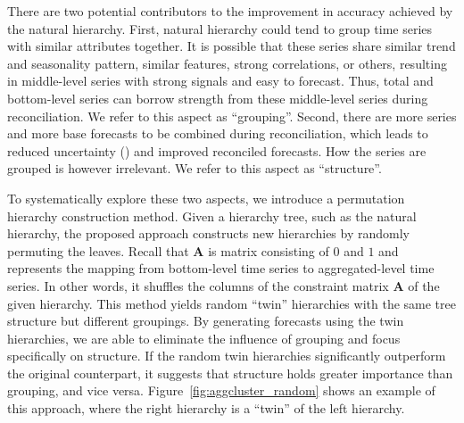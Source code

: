 \documentclass[a4paper,review,12pt,authoryear]{elsarticle}
\begin{document}
There are two potential contributors to the improvement in accuracy achieved by the natural hierarchy. First, natural hierarchy could tend to group time series with similar attributes together. 
It is possible that these series share similar trend and seasonality pattern, similar features, strong correlations, or others, resulting in middle-level series with strong signals and easy to forecast.
Thus, total and bottom-level series can borrow strength from these middle-level series during reconciliation. 
We refer to this aspect as ``grouping''.
Second, there are more series and more base forecasts to be combined during reconciliation, which leads to reduced uncertainty (\citealp{petropoulosExploringSourcesUncertainty2018a}) and improved reconciled forecasts. How the series are grouped is however irrelevant. We refer to this aspect as ``structure''. 

To systematically explore these two aspects, we introduce a permutation hierarchy construction method.
Given a hierarchy tree, such as the natural hierarchy, the proposed approach constructs new hierarchies by randomly permuting the leaves. Recall that $\boldsymbol{A}$ is matrix consisting of $0$ and $1$ and represents the mapping from bottom-level time series to aggregated-level time series. In other words, it shuffles the columns of the constraint matrix $\boldsymbol{A}$ of the given hierarchy. This method yields random ``twin'' hierarchies with the same tree structure but different groupings. 
By generating forecasts using the twin hierarchies, we are able to eliminate the influence of grouping and focus specifically on structure. 
If the random twin hierarchies significantly outperform the original counterpart, it suggests that structure holds greater importance than grouping, and vice versa. Figure~\ref{fig:aggcluster_random} shows an example of this approach, where the right hierarchy is a ``twin'' of the left hierarchy.
\end{document}
